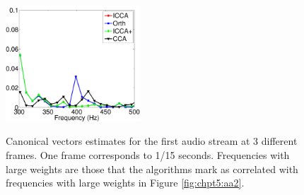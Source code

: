 \begin{figure}
\begin{center}
{      \label{fig:chpt5:aa1_3_zoom}
      \includegraphics[width=0.45\textwidth]{chpt5_icca_vect/figs/aa1_3_zoom.pdf}
    }
    \caption{Canonical vectors estimates for the first audio stream at 3 different
      frames. One frame corresponds to 1/15 seconds. Frequencies with large weights are
      those that the algorithms mark as correlated with frequencies with large weights in
      Figure \ref{fig:chpt5:aa2}.}
    \label{fig:chpt5:aa1}
  \end{center}
\end{figure}

